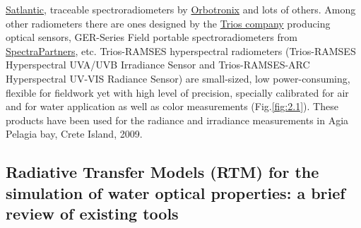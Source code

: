 \documentclass[11pt]{article}
\begin{document}
\href{http://www.satlantic.com}{Satlantic}, traceable spectroradiometers by \href{http://www.orboptronix.com}{Orbotronix} 
and lots of others. Among other radiometers there are ones designed by the \href{http://www.trios.de/}{Trios company} producing
optical sensors, GER-Series Field portable spectroradiometers from
\href{http://www.spectrapartners.nl/}{SpectraPartners}, etc. \ac{Trios-RAMSES} hyperspectral radiometers
(\ac{Trios-RAMSES} Hyperspectral \ac{UVA}/\ac{UVB} Irradiance Sensor and \ac{Trios-RAMSES}-ARC Hyperspectral \ac{UV}-\ac{VIS} Radiance Sensor) are small-sized, low power-consuming, flexible for fieldwork yet with high
level of precision, specially calibrated for air and for water application as well as color
measurements  (Fig.\ref{fig:2.1}). These products have been used for the radiance and irradiance
measurements in Agia Pelagia bay, Crete Island, 2009.

\subsection[Radiative Transfer Models (RTM)]{Radiative Transfer Models (RTM) for the simulation of water optical properties: a brief review of existing tools}
\end{document}
